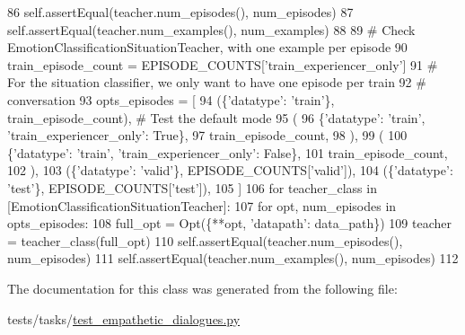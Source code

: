 \begin{DoxyCode}
86                     self.assertEqual(teacher.num\_episodes(), num\_episodes)
87                     self.assertEqual(teacher.num\_examples(), num\_examples)
88 
89             \textcolor{comment}{# Check EmotionClassificationSituationTeacher, with one example per episode}
90             train\_episode\_count = EPISODE\_COUNTS[\textcolor{stringliteral}{'train\_experiencer\_only'}]
91             \textcolor{comment}{# For the situation classifier, we only want to have one episode per train}
92             \textcolor{comment}{# conversation}
93             opts\_episodes = [
94                 (\{\textcolor{stringliteral}{'datatype'}: \textcolor{stringliteral}{'train'}\}, train\_episode\_count),  \textcolor{comment}{# Test the default mode}
95                 (
96                     \{\textcolor{stringliteral}{'datatype'}: \textcolor{stringliteral}{'train'}, \textcolor{stringliteral}{'train\_experiencer\_only'}: \textcolor{keyword}{True}\},
97                     train\_episode\_count,
98                 ),
99                 (
100                     \{\textcolor{stringliteral}{'datatype'}: \textcolor{stringliteral}{'train'}, \textcolor{stringliteral}{'train\_experiencer\_only'}: \textcolor{keyword}{False}\},
101                     train\_episode\_count,
102                 ),
103                 (\{\textcolor{stringliteral}{'datatype'}: \textcolor{stringliteral}{'valid'}\}, EPISODE\_COUNTS[\textcolor{stringliteral}{'valid'}]),
104                 (\{\textcolor{stringliteral}{'datatype'}: \textcolor{stringliteral}{'test'}\}, EPISODE\_COUNTS[\textcolor{stringliteral}{'test'}]),
105             ]
106             \textcolor{keywordflow}{for} teacher\_class \textcolor{keywordflow}{in} [EmotionClassificationSituationTeacher]:
107                 \textcolor{keywordflow}{for} opt, num\_episodes \textcolor{keywordflow}{in} opts\_episodes:
108                     full\_opt = Opt(\{**opt, \textcolor{stringliteral}{'datapath'}: data\_path\})
109                     teacher = teacher\_class(full\_opt)
110                     self.assertEqual(teacher.num\_episodes(), num\_episodes)
111                     self.assertEqual(teacher.num\_examples(), num\_episodes)
112 
\end{DoxyCode}


The documentation for this class was generated from the following file\+:\begin{DoxyCompactItemize}
\item 
tests/tasks/\hyperlink{test__empathetic__dialogues_8py}{test\+\_\+empathetic\+\_\+dialogues.\+py}\end{DoxyCompactItemize}
